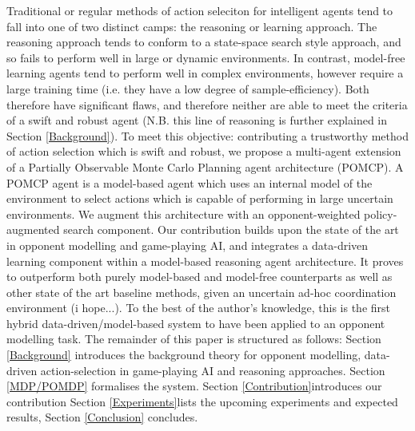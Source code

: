 \newline \newline
Traditional or regular methods of action seleciton for intelligent agents tend to fall into one of two distinct camps: the reasoning or learning approach. The reasoning approach tends to conform to a state-space search style approach, and so fails to perform well in large or dynamic environments. In contrast, model-free learning agents tend to perform well in complex environments, however require a large training time (i.e. they have a low degree of sample-efficiency). Both therefore have significant flaws, and therefore neither are able to meet the criteria of a swift and robust agent (N.B. this line of reasoning is further explained in Section \ref{Background}). 
\newline \newline
To meet this objective: contributing a trustworthy method of action selection which is swift and robust, we propose a multi-agent extension of a Partially Observable Monte Carlo Planning agent architecture (POMCP). A POMCP agent is a model-based agent which uses an internal model of the environment to select actions which is capable of performing in large uncertain environments. We augment this architecture with an opponent-weighted policy-augmented search component. Our contribution builds upon the state of the art in opponent modelling and game-playing AI, and integrates a data-driven learning component within a model-based reasoning agent architecture. It proves to outperform both purely model-based and model-free counterparts as well as other state of the art baseline methods, given an uncertain  ad-hoc coordination environment (i hope...). To the best of the author's knowledge, this is the first hybrid data-driven/model-based system to have been applied to an opponent modelling task. 
\newline \newline
The remainder of this paper is structured as follows: Section \ref{Background} introduces the background theory for opponent modelling, data-driven action-selection in game-playing AI and reasoning approaches. 
Section \ref{MDP/POMDP} formalises the system. 
Section \ref{Contribution}introduces our contribution
Section \ref{Experiments}lists the upcoming experiments and expected results, 
Section \ref{Conclusion} concludes. 